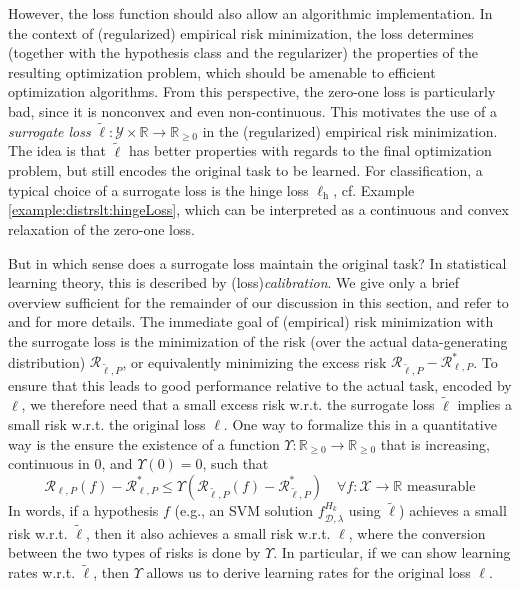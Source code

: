 \documentclass[letterpaper]{article} %
\newcommand{\R}{\mathbb{R}}
\newcommand{\Rnn}{\R_{\geq 0}}
\newcommand{\inputSet}{\mathcal{X}} %
\newcommand{\outputSet}{\mathcal{Y}} %
\newcommand{\dataSet}{\mathcal{D}}
\newcommand{\svm}[2]{f_{{#2},{#1}}} %
\newcommand{\risk}{\mathcal{R}} %
\newcommand{\Risk}[2]{\risk_{{#1},{#2}}} %
\newcommand{\RiskBayes}[2]{\risk_{{#1},{#2}}^\ast} %
\newcommand{\defm}[1]{\emph{#1}}
\newcommand{\ellHinge}{\ell_{\mathrm{h}}} %
\begin{document}
However, the loss function should also allow an algorithmic implementation.
In the context of (regularized) empirical risk minimization, the loss determines (together with the hypothesis class and the regularizer) the properties of the resulting optimization problem, which should be amenable to efficient optimization algorithms.
From this perspective, the zero-one loss is particularly bad, since it is nonconvex and even non-continuous.
This motivates the use of a \defm{surrogate loss} $\tilde\ell:\outputSet\times\R\rightarrow\Rnn$ in the (regularized) empirical risk minimization.
The idea is that $\tilde\ell$ has better properties with regards to the final optimization problem, but still encodes the original task to be learned.
For classification, a typical choice of a surrogate loss is the hinge loss $\ellHinge$, cf. Example \ref{example:distrslt:hingeLoss}, which can be interpreted as a continuous and convex relaxation of the zero-one loss.

But in which sense does a surrogate loss maintain the original task?
In statistical learning theory, this is described by (loss)\defm{calibration}.
We give only a brief overview sufficient for the remainder of our discussion in this section, and refer to \cite[Chapters~2,3]{SC08} and \cite[Chapter~4]{bach2024learning} for more details.
The immediate goal of (empirical) risk minimization with the surrogate loss is the minimization of the risk (over the actual data-generating distribution) $\Risk{\tilde\ell}{P}$, or equivalently minimizing the excess risk $\Risk{\tilde\ell}{P}-\RiskBayes{\ell}{P}$.
To ensure that this leads to good performance relative to the actual task, encoded by $\ell$, we therefore need that a small excess risk w.r.t. the surrogate loss $\tilde\ell$ implies a small risk w.r.t. the original loss $\ell$.
One way to formalize this in a quantitative way is the ensure the existence of a function $\Upsilon: \Rnn \rightarrow\Rnn$ that is increasing, continuous in 0, and $\Upsilon(0)=0$, such that
\begin{equation*}
    \Risk{\ell}{P}(f)-\RiskBayes{\ell}{P} \leq \Upsilon\left(\Risk{\tilde\ell}{P}(f) - \RiskBayes{\tilde\ell}{P}\right)
    \quad \forall f: \inputSet\rightarrow\R \text{ measurable}
\end{equation*}
In words, if a hypothesis $f$ (e.g., an SVM solution $\svm{\lambda}{\dataSet}^{H_k}$ using $\tilde\ell$) achieves a small risk w.r.t. $\tilde\ell$,
then it also achieves a small risk w.r.t. $\ell$, where the conversion between the two types of risks is done by $\Upsilon$.
In particular, if we can show learning rates w.r.t. $\tilde\ell$, then $\Upsilon$ allows us to derive learning rates for the original loss $\ell$.
\end{document}
